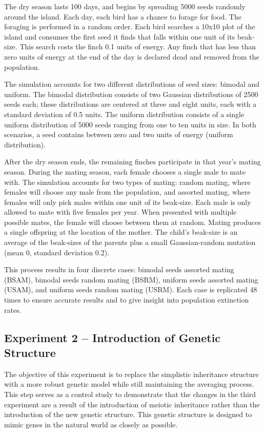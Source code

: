\documentclass{article}
\begin{document}
The dry season lasts 100 days, and begins by spreading 5000 seeds randomly around the island. Each day, each bird has a chance to forage for food. The foraging is performed in a random order. Each bird searches a 10x10 plot of the island and consumes the first seed it finds that falls within one unit of its beak-size. This search costs the finch 0.1 units of energy. Any finch that has less than zero units of energy at the end of the day is declared dead and removed from the population.

The simulation accounts for two different distributions of seed sizes: bimodal and uniform. The bimodal distribution consists of two Gaussian distributions of 2500 seeds each; these distributions are centered at three and eight units, each with a standard deviation of 0.5 units. The uniform distribution consists of a single uniform distribution of 5000 seeds ranging from one to ten units in size. In both scenarios, a seed contains between zero and two units of energy (uniform distribution).

After the dry season ends, the remaining finches participate in that year's mating season. During the mating season, each female chooses a single male to mate with. The simulation accounts for two types of mating: random mating, where females will choose any male from the population, and assorted mating, where females will only pick males within one unit of its beak-size. Each male is only allowed to mate with five females per year. When presented with multiple possible mates, the female will choose between them at random. Mating produces a single offspring at the location of the mother. The child’s beak-size is an average of the beak-sizes of the parents plus a small Gaussian-random mutation (mean 0, standard deviation 0.2).

This process results in four discrete cases: bimodal seeds assorted mating (BSAM), bimodal seeds random mating (BSRM), uniform seeds assorted mating (USAM), and uniform seeds random mating (USRM). Each case is replicated 48 times to ensure accurate results and to give insight into population extinction rates. 



\subsection{Experiment 2 -- Introduction of Genetic Structure}

The objective of this experiment is to replace the simplistic inheritance structure with a more robust genetic model while still maintaining the averaging process. This step serves as a control study to demonstrate that the changes in the third experiment are a result of the introduction of meiotic inheritance rather than the introduction of the new genetic structure. This genetic structure is designed to mimic genes in the natural world as closely as possible.
\end{document}
